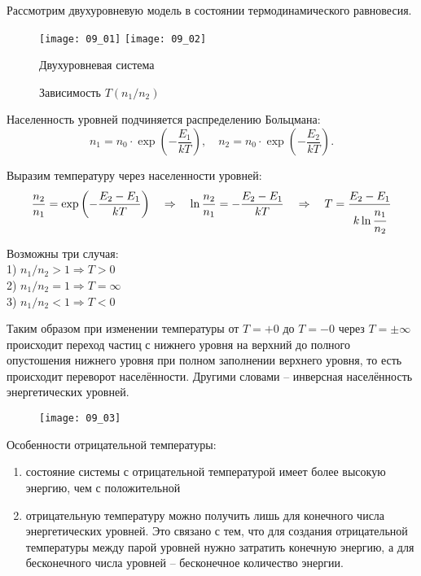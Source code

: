 
Рассмотрим двухуровневую модель в состоянии термодинамического равновесия.
\begin{figure}[h!]
    \center
    \texttt{[image: 09\_01]} \hspace{1em}
    \texttt{[image: 09\_02]} \\
    \parbox{.4\textwidth}{\caption{Двухуровневая система}} \hspace{1em}
    \parbox{.4\textwidth}{\caption{Зависимость \( T(n_1 / n_2) \)}}
\end{figure}

Населенность уровней подчиняется распределению Больцмана:
\[
    n_1 = n_0 \cdot \exp\left( -\frac{E_1}{kT} \right), \quad
    n_2 = n_0 \cdot \exp\left( -\frac{E_2}{kT} \right).
\]

Выразим температуру через населенности уровней:
\[
	\frac{n_2}{n_1} = \exp\left( -\frac{E_2-E_1}{kT} \right) 
    \quad \Rightarrow \quad
    \ln\frac{n_2}{n_1} = -\frac{E_2-E_1}{kT}
    \quad \Rightarrow \quad 
    T = \frac{E_2-E_1}{k\ln\cfrac{n_1}{n_2}}
\]

Возможны три случая:\\
1) \( n_1 / n_2 > 1 \Rightarrow T > 0 \) \\
2) \( n_1 / n_2 = 1 \Rightarrow T = \infty \) \\
3) \( n_1 / n_2 < 1 \Rightarrow T < 0 \)

Таким образом при изменении температуры от \( T = +0 \) до \( T = -0 \) через 
\( T = \pm\infty \) происходит переход частиц с нижнего уровня на верхний до 
полного опустошения нижнего уровня при полном заполнении верхнего уровня, то 
есть происходит переворот населённости. Другими словами -- инверсная 
населённость энергетических уровней.

\begin{figure}[h!]
	\center
	\texttt{[image: 09\_03]}
\end{figure}

Особенности отрицательной температуры:
\begin{enumerate}
	\item состояние системы с отрицательной температурой имеет более высокую 
    	энергию, чем с положительной 
    \item отрицательную температуру можно получить лишь для конечного числа 
    	энергетических уровней. Это связано с тем, что для создания 
    	отрицательной температуры между парой уровней нужно затратить конечную 
    	энергию, а для бесконечного числа уровней -- бесконечное количество 
    	энергии.
\end{enumerate}
